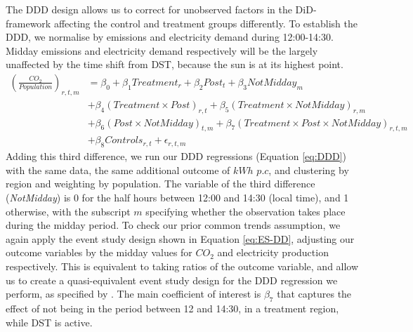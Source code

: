 The DDD design allows us to correct for unobserved factors in the \ac{DiD}-framework affecting the control and treatment groups differently. To establish the \ac{DDD}, we normalise by emissions and electricity demand during 12:00-14:30. Midday emissions and electricity demand respectively will be the largely unaffected by the time shift from DST, because the sun is at its highest point. 
\begin{align}
    \label{eq:DDD}
    \left(\frac{CO_2}{Population}\right)_{r,t,m} &= \beta_0 + \beta_1Treatment_{r} + \beta_2Post_{t} + \beta_3NotMidday_{m}   \\
    & +\beta_4(Treatment \times Post)_{r,t} + 
    \beta_5(Treatment \times NotMidday)_{r,m} \nonumber \\ 
    & +\beta_6(Post \times NotMidday)_{t,m} + \beta_7 (Treatment \times Post \times NotMidday)_{r,t,m} \nonumber \\ 
    &+ \beta_8 Controls_{r,t}  + \epsilon_{r,t,m}
    \nonumber 
\end{align}
Adding this third difference, we run our DDD regressions (Equation \ref{eq:DDD}) with the same data, the same additional outcome of $kWh$ $p.c$, and clustering by region and weighting by population. The variable of the third difference (\textit{NotMidday}) is 0 for the half hours between 12:00 and 14:30 (local time), and 1 otherwise, with the subscript $m$ specifying whether the observation takes place during the midday period.
To check our prior common trends assumption, we again apply the event study design shown in Equation \ref{eq:ES-DD}, adjusting our outcome variables by the midday values for $CO_2$ and electricity production respectively. This is equivalent to taking ratios of the outcome variable, and allow us to create a quasi-equivalent event study design for the \ac{DDD} regression we perform, as specified by \textcite{olden_triple_2022}. The main coefficient of interest is $\beta_7$ that captures the effect of not being in the period between 12 and 14:30, in a treatment region, while \ac{DST} is active.

